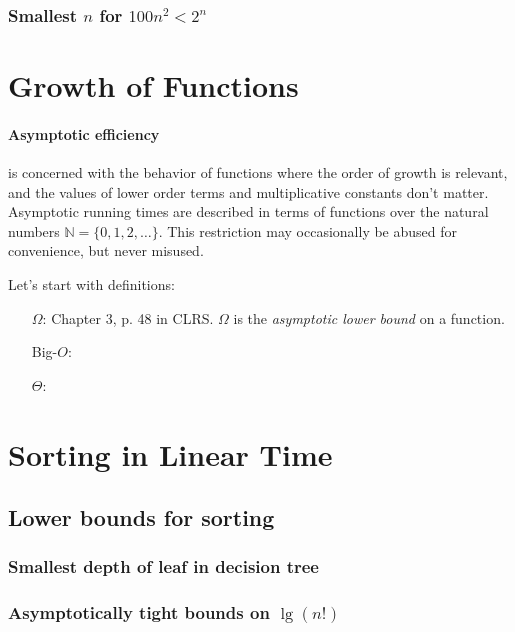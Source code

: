 \documentclass{article}
\begin{document}
\subsubsection{Smallest $n$ for $100n^2 < 2^n$}

\setcounter{section}{2}
\section{Growth of Functions}\label{sec:growthfunctions}


\paragraph{Asymptotic efficiency} is concerned with the behavior of functions where the
order of growth is relevant, and the values of lower order terms and multiplicative
constants don't matter.
Asymptotic running times are described in terms of functions over the natural
numbers $\mathbb{N} = \{ 0, 1, 2,\ldots\}$. This restriction may occasionally be
abused for convenience, but never misused.

Let's start with definitions:

\begin{itemize}
  \item [$\Omega$:] Chapter 3, p. 48 in CLRS. $\Omega$ is the \emph{asymptotic lower
  bound} on a function.
  \item [Big-$O$:]
  \item [$\Theta$:]
\end{itemize}




\setcounter{section}{7}
\section{Sorting in Linear Time}\label{sec:lineartime}

\subsection{Lower bounds for sorting}

\subsubsection{Smallest depth of leaf in decision tree}

\subsubsection{Asymptotically tight bounds on $\lg(n!)$}
\end{document}
